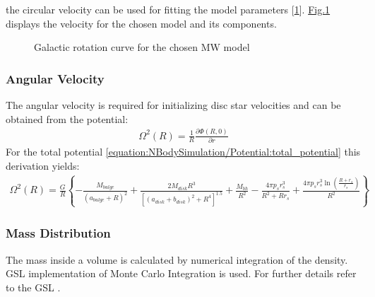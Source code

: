 \documentclass[letterpaper,10pt,english]{sphinxmanual}
\begin{document}
				\sphinxAtStartPar
				the circular velocity can be used for fitting the model parameters {[}\hyperlink{cite.NBodySimulation/Appendix:id60}{1}{]}.
				\hyperref[\detokenize{NBodySimulation/Potential:fig-potential-circular-velocity}]{Fig.\@ \ref{\detokenize{NBodySimulation/Potential:fig-potential-circular-velocity}}} displays the velocity for the chosen model and its components.
				
				\begin{figure}[htbp]
				\centering
				\capstart
				
				\noindent{}
				\caption{Galactic rotation curve for the chosen MW model}\label{\detokenize{NBodySimulation/Potential:id9}}\label{\detokenize{NBodySimulation/Potential:fig-potential-circular-velocity}}\end{figure}
			
			
			\subsubsection{Angular Velocity}
				\label{\detokenize{NBodySimulation/Potential:angular-velocity}}
				\sphinxAtStartPar
				The angular velocity is required for initializing disc star velocities and can be obtained from the potential:
				\begin{equation*}
				\begin{split}\Omega ^{2}\left ( R \right ) = \frac{1}{R}\frac{\partial \Phi \left ( R,0 \right )}{\partial r}\end{split}
				\end{equation*}
				\sphinxAtStartPar
				For the total potential \eqref{equation:NBodySimulation/Potential:total_potential} this derivation yields:
				\begin{equation*}
				\begin{split}\Omega ^{2}\left ( R \right ) = \frac{G}{R} \left\{-\frac{M_{bulge}}{(a_{bulge}+R)^2}+\frac{2 M_{disk} R^3}{\left[\left(a_{disk}+b_{disk}\right)^2+R^4\right]^{1.5}}+\frac{M_{bh}}{R^2}-\frac{4 \pi  p_{s} r_{s}^3}{R^2+R r_{s}}+\frac{4 \pi  p_{s} r_{s}^3 \ln \left(\frac{R+r_{s}}{r_{s}}\right)}{R^2}\right\}\end{split}
				\end{equation*}
			
			\subsubsection{Mass Distribution}
				\label{\detokenize{NBodySimulation/Potential:mass-distribution}}
				\sphinxAtStartPar
				The mass inside a volume is calculated by numerical integration of the density.
				GSL implementation of Monte Carlo Integration is used. For further details refer to the GSL .
				
\end{document}
